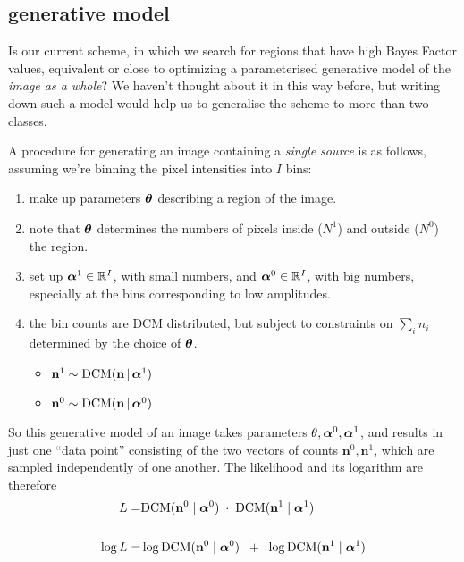 \documentclass[12pt]{article}
\newcommand{\given}{\,|\,}
\renewcommand{\vec}[1]{\mathbf{#1}}
\newcommand{\balpha}{\mbox{\boldmath $\alpha$}}
\newcommand{\btheta}{\mbox{\boldmath $\theta$}}
\newcommand{\DCM}{\mbox{DCM}}
\begin{document}
\subsection{generative model}
Is our current scheme, in which we search for regions that have high
Bayes Factor values, equivalent or close to optimizing a parameterised
generative model of the \emph{image as a whole}? We haven't thought about it
in this way before, but writing down such a model would help us to
generalise the scheme to more than two classes.

A procedure for generating an image containing a \emph{single source}
is as follows, assuming we're binning the pixel intensities into $I$ bins:
\begin{enumerate}
\item make up parameters $\btheta$ describing a region of the image.
\item note that $\btheta$ determines the numbers of pixels inside ($N^1$)  and  outside ($N^0$) the region.
\item set up $\balpha^1 \in \mathbb{R}^I$, with small numbers,
  and $\balpha^0 \in \mathbb{R}^I$, with big numbers, especially at the bins corresponding to low amplitudes.
\item the bin counts are DCM distributed, but subject to constraints on $\sum_i n_i$ determined by the choice of $\btheta$.
  \begin{itemize}
    \item    $\vec{n}^1 \sim \DCM(\vec{n} \given \balpha^1)$
    \item $\vec{n}^0 \sim \DCM(\vec{n} \given \balpha^0)$
  \end{itemize}
\end{enumerate}

So this generative model of an image takes parameters $\theta,
\balpha^0, \balpha^1$, and results in just one ``data point''
consisting of the two vectors of counts $\vec{n}^0,\vec{n}^1$, which are sampled independently of one another.  The
likelihood and its logarithm are therefore
\begin{align*}
L =& \DCM(\vec{n}^0 \mid \balpha^0) \; \cdot \; \DCM(\vec{n}^1 \mid \balpha^1) 
\\ \\
\log L =& \log \DCM(\vec{n}^0 \mid \balpha^0) \;\; + \;\; \log \DCM(\vec{n}^1 \mid \balpha^1) 
\end{align*}
\end{document}
